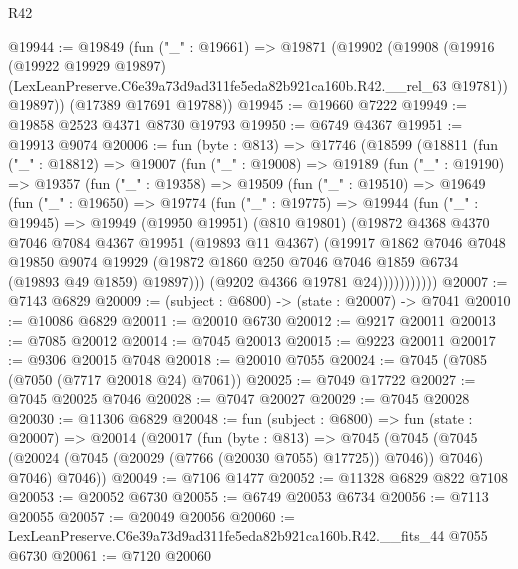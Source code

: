 \begin{lexlean}{R42}
\begin{coremodule}
{@19944 := @19849
    (fun ("_" : @19661) =>
    @19871
      (@19902
        (@19908
          (@19916
            (@19922 @19929 @19897)
            (LexLeanPreserve.C6e39a73d9ad311fe5eda82b921ca160b.R42.__rel_63 @19781))
          @19897))
      (@17389 @17691 @19788))
@19945 := @19660 @7222
@19949 := @19858 @2523 @4371 @8730 @19793
@19950 := @6749 @4367
@19951 := @19913 @9074
@20006 := fun (byte : @813) =>
  @17746
    (@18599
      (@18811
        (fun ("_" : @18812) =>
        @19007
          (fun ("_" : @19008) =>
          @19189
            (fun ("_" : @19190) =>
            @19357
              (fun ("_" : @19358) =>
              @19509
                (fun ("_" : @19510) =>
                @19649
                  (fun ("_" : @19650) =>
                  @19774
                    (fun ("_" : @19775) =>
                    @19944
                      (fun ("_" : @19945) =>
                      @19949
                        (@19950 @19951)
                        (@810 @19801)
                        (@19872
                          @4368
                          @4370
                          @7046
                          @7084
                          @4367
                          @19951
                          (@19893 @11 @4367)
                          (@19917
                            @1862
                            @7046
                            @7048
                            @19850
                            @9074
                            @19929
                            (@19872 @1860 @250 @7046 @7046 @1859 @6734 (@19893 @49 @1859) @19897)))
                        (@9202 @4366 @19781 @24)))))))))))
@20007 := @7143 @6829
@20009 := (subject : @6800) -> (state : @20007) -> @7041
@20010 := @10086 @6829
@20011 := @20010 @6730
@20012 := @9217 @20011
@20013 := @7085 @20012
@20014 := @7045 @20013
@20015 := @9223 @20011
@20017 := @9306 @20015 @7048
@20018 := @20010 @7055
@20024 := @7045 (@7085 (@7050 (@7717 @20018 @24) @7061))
@20025 := @7049 @17722
@20027 := @7045 @20025 @7046
@20028 := @7047 @20027
@20029 := @7045 @20028
@20030 := @11306 @6829
@20048 := fun (subject : @6800) =>
  fun (state : @20007) =>
  @20014
    (@20017
      (fun (byte : @813) =>
      @7045
        (@7045 (@7045 (@20024 (@7045 (@20029 (@7766 (@20030 @7055) @17725)) @7046)) @7046) @7046)
        @7046))
@20049 := @7106 @1477
@20052 := @11328 @6829 @822 @7108
@20053 := @20052 @6730
@20055 := @6749 @20053 @6734
@20056 := @7113 @20055
@20057 := @20049 @20056
@20060 := LexLeanPreserve.C6e39a73d9ad311fe5eda82b921ca160b.R42.__fits_44 @7055 @6730
@20061 := @7120 @20060
}
\end{coremodule}
\end{lexlean}
